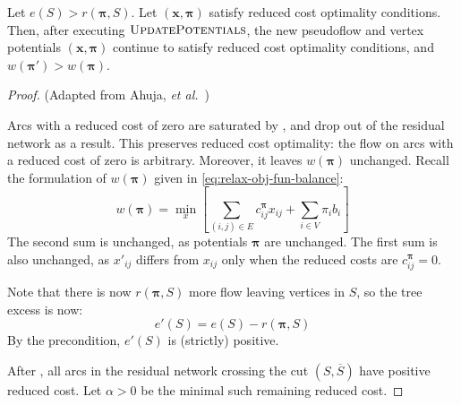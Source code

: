 \begin{lemma} \label{lemma:relax-correctness-updatepotentials}
Let $e(S) > r(\boldsymbol{\pi},S)$. Let $\left(\mathbf{x},\boldsymbol{\pi}\right)$ satisfy reduced cost optimality conditions. Then, after executing $\textproc{UpdatePotentials}$, the new pseudoflow and vertex potentials $\left(\mathbf{x},\boldsymbol{\pi}\right)$ continue to satisfy reduced cost optimality conditions, and $w(\boldsymbol{\pi}') > w(\boldsymbol{\pi})$.
\end{lemma}
\begin{proof} (Adapted from Ahuja, \textit{et al.}~\cite[p.~334]{Ahuja:1993})
    
Arcs with a reduced cost of zero are saturated by , and drop out of the residual network as a result. This preserves reduced cost optimality: the flow on arcs with a reduced cost of zero is arbitrary. Moreover, it leaves $w(\boldsymbol{\pi})$ unchanged. Recall the formulation of $w(\boldsymbol{\pi})$ given in \cref{eq:relax-obj-fun-balance}:
\[w(\boldsymbol{\pi})=\min_{x}\left[\sum_{\left(i,j\right)\in E}c_{ij}^{\boldsymbol{\pi}}x_{ij}+\sum_{i\in V}\pi_{i}b_{i}\right]\]
The second sum is unchanged, as potentials $\mathbf{\pi}$ are unchanged. The first sum is also unchanged, as $x'_{ij}$ differs from $x_{ij}$ only when the reduced costs are $c_{ij}^{\boldsymbol{\pi}}=0$.

Note that there is now $r(\boldsymbol{\pi},S)$ more flow leaving vertices in $S$, so the tree excess is now:
\[e'(S) = e(S) - r(\boldsymbol{\pi},S)\]
By the precondition, $e'(S)$ is (strictly) positive.

After , all arcs in the residual network crossing the cut $\left(S,\overline{S}\right)$ have positive reduced cost\footnotemark. Let $\alpha > 0$ be the minimal such remaining reduced cost.


\end{proof}
